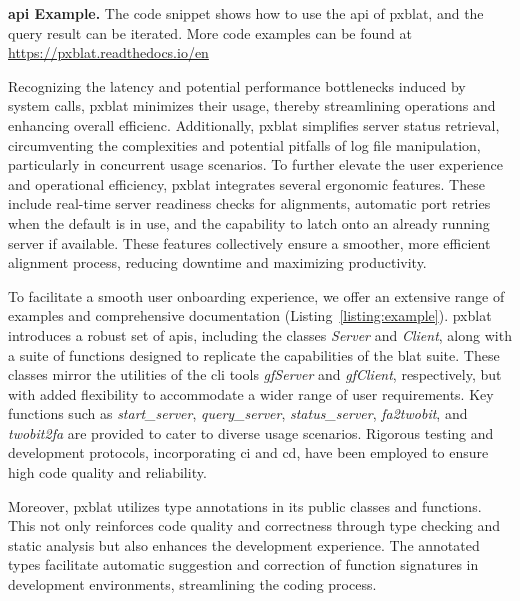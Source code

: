 \documentclass[10pt,letterpaper]{article}
\begin{document}
\begin{listing}
	\inputminted[breaklines]{python}{code/example1.py}
	\caption{{\bf \gls{api} Example.} The code snippet shows how to use the \gls{api} of \gls{pxblat},
		and the query result can be iterated. More code examples can be found at \url{https://pxblat.readthedocs.io/en}}
	\label{listing:example}
\end{listing}

Recognizing the latency and potential performance bottlenecks induced by system calls, \gls{pxblat} minimizes their usage, thereby streamlining operations and enhancing overall efficienc.
Additionally, \gls{pxblat} simplifies server status retrieval, circumventing the complexities and potential pitfalls of log file manipulation, particularly in concurrent usage scenarios.
To further elevate the user experience and operational efficiency, \gls{pxblat} integrates several ergonomic features.
These include real-time server readiness checks for alignments, automatic port retries when the default is in use, and the capability to latch onto an already running server if available.
These features collectively ensure a smoother, more efficient alignment process, reducing downtime and maximizing productivity.

To facilitate a smooth user onboarding experience, we offer an extensive range of examples and comprehensive documentation (Listing~\ref{listing:example}).
\gls{pxblat} introduces a robust set of \glspl{api}, including the classes \emph{Server} and \emph{Client}, along with a suite of functions designed to replicate the capabilities of the \gls{blat} suite.
These classes mirror the utilities of the \gls{cli} tools \emph{gfServer} and \emph{gfClient}, respectively, but with added flexibility to accommodate a wider range of user requirements.
Key functions such as \emph{start\_server}, \emph{query\_server}, \emph{status\_server}, \emph{fa2twobit}, and \emph{twobit2fa} are provided to cater to diverse usage scenarios.
Rigorous testing and development protocols, incorporating \gls{ci} and \gls{cd}, have been employed to ensure high code quality and reliability.

Moreover, \gls{pxblat} utilizes type annotations in its public classes and functions.
This not only reinforces code quality and correctness through type checking and static analysis but also enhances the development experience.
The annotated types facilitate automatic suggestion and correction of function signatures in development environments, streamlining the coding process.
\end{document}
